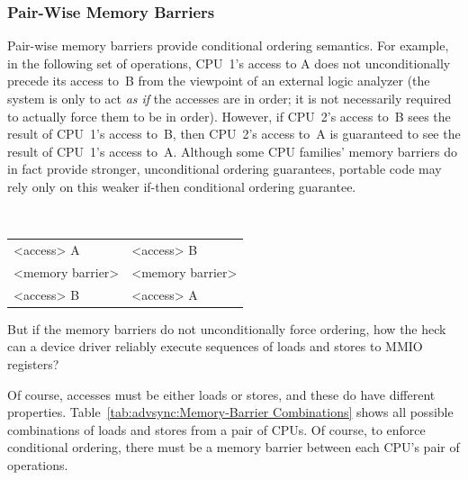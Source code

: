 \subsubsection{Pair-Wise Memory Barriers}

Pair-wise memory barriers provide conditional ordering semantics.
For example, in the following set of operations, CPU~1's access to
A does not unconditionally precede its access to~B from the viewpoint
of an external logic analyzer
	 {(the system is only to act \emph{as if} the accesses
	  are in order; it is not necessarily required to actually
	  force them to be in order).}
However, if CPU~2's access to~B sees the result of CPU~1's access
to~B, then CPU~2's access to~A is guaranteed to see the result of
CPU~1's access to~A.
Although some CPU families' memory barriers do in fact provide stronger,
unconditional ordering guarantees, portable code may rely only
on this weaker if-then conditional ordering guarantee.

\vspace{5pt}
\begin{minipage}[t]{\columnwidth}
\tt
\scriptsize
\begin{tabular}{l|l}
	\nf{CPU 1}	& \nf{CPU 2} \\
	\hline
	<access> A	& <access> B \\
	<memory barrier>& <memory barrier> \\
	<access> B	& <access> A \\
\end{tabular}
\end{minipage}
\vspace{5pt}

\QuickQuiz{}
	But if the memory barriers do not unconditionally force
	ordering, how the heck can a device driver reliably execute
	sequences of loads and stores to MMIO registers?
 \QuickQuizEnd

Of course, accesses must be either loads or stores, and these
do have different properties.
Table~\ref{tab:advsync:Memory-Barrier Combinations}
shows all possible combinations of loads and stores from a pair
of CPUs.
Of course, to enforce conditional ordering, there must be
a memory barrier between each CPU's pair of operations.

